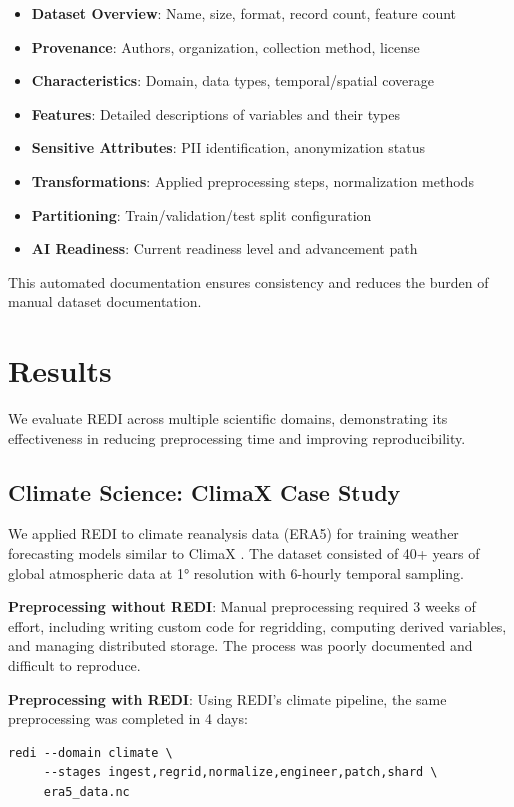 \documentclass[11pt,letterpaper,twocolumn]{article}
\begin{document}
\begin{itemize}
    \item \textbf{Dataset Overview}: Name, size, format, record count, feature count
    \item \textbf{Provenance}: Authors, organization, collection method, license
    \item \textbf{Characteristics}: Domain, data types, temporal/spatial coverage
    \item \textbf{Features}: Detailed descriptions of variables and their types
    \item \textbf{Sensitive Attributes}: PII identification, anonymization status
    \item \textbf{Transformations}: Applied preprocessing steps, normalization methods
    \item \textbf{Partitioning}: Train/validation/test split configuration
    \item \textbf{AI Readiness}: Current readiness level and advancement path
\end{itemize}

This automated documentation ensures consistency and reduces the burden of manual dataset documentation.

\section{Results}

We evaluate REDI across multiple scientific domains, demonstrating its effectiveness in reducing preprocessing time and improving reproducibility.

\subsection{Climate Science: ClimaX Case Study}

We applied REDI to climate reanalysis data (ERA5) for training weather forecasting models similar to ClimaX \citep{climax2023}. The dataset consisted of 40+ years of global atmospheric data at 1° resolution with 6-hourly temporal sampling.

\textbf{Preprocessing without REDI}: Manual preprocessing required 3 weeks of effort, including writing custom code for regridding, computing derived variables, and managing distributed storage. The process was poorly documented and difficult to reproduce.

\textbf{Preprocessing with REDI}: Using REDI's climate pipeline, the same preprocessing was completed in 4 days:
\begin{verbatim}
redi --domain climate \
     --stages ingest,regrid,normalize,engineer,patch,shard \
     era5_data.nc
\end{verbatim}
\end{document}
